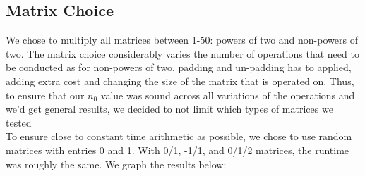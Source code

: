 \documentclass[11pt]{scrartcl}
\theoremstyle{dotlessP}
\theoremstyle{dotlessN}
\theoremstyle{dotN}
\begin{document}
\subsection{Matrix Choice}
We chose to multiply all matrices between 1-50: powers of two and non-powers of two. The matrix choice considerably varies the number of operations that need to be conducted as for non-powers of two, padding and un-padding has to applied, adding extra cost and changing the size of the matrix that is operated on. Thus, to ensure that our $n_0$ value was sound across all variations of the operations and we'd get general results, we decided to not limit which types of matrices we tested \\ 

To ensure close to constant time arithmetic as possible, we chose to use random matrices with entries 0 and 1. With 0/1, -1/1, and 0/1/2 matrices, the runtime was roughly the same. We graph the results below:
\end{document}
